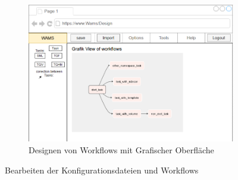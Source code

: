 \begin{figure}[ht]
\begin{subfigure}{.75\textwidth}
        \includegraphics[width = \textwidth]{Grafiken/Gui Mockups/workflowGui-Design.drawio.png}
        \caption{Designen von Workflows mit Grafischer Oberfläche}
        \label{fig:sfigGraficDesign}
   \end{subfigure}
   \caption{Bearbeiten der Konfigurationsdateien und Workflows}
   \label{fig:Abb 4}
\end{figure}
    
